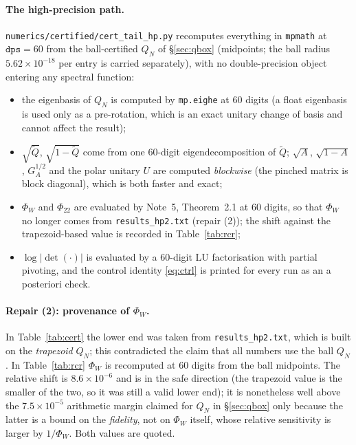 \documentclass[11pt]{article}
\begin{document}
\paragraph{The high-precision path.}  \texttt{numerics/certified/cert\_tail\_hp.py} recomputes
everything in \texttt{mpmath} at $\mathtt{dps}=60$ from the ball-certified $Q_N$ of
\S\ref{sec:qbox} (midpoints; the ball radius $5.62\times10^{-18}$ per entry is carried separately),
with no double-precision object entering any spectral function:
\begin{itemize}[leftmargin=1.6em]
\item the eigenbasis of $Q_N$ is computed by \texttt{mp.eighe} at $60$ digits (a float eigenbasis is
 used only as a pre-rotation, which is an exact unitary change of basis and cannot affect the result);
\item $\sqrt{\widetilde Q}$, $\sqrt{1-\widetilde Q}$ come from one $60$-digit eigendecomposition of
 $\widetilde Q$; $\sqrt A$, $\sqrt{1-A}$, $G_A^{1/2}$ and the polar unitary $U$ are computed
 \emph{blockwise} (the pinched matrix is block diagonal), which is both faster and exact;
\item $\Phi_W$ and $\Phi_{22}$ are evaluated by Note~5, Theorem~2.1 at $60$ digits, so that
 $\Phi_W$ no longer comes from \texttt{results\_hp2.txt} (repair (2)); the shift against the
 trapezoid-based value is recorded in Table~\ref{tab:rcr};
\item $\log|\det(\cdot)|$ is evaluated by a $60$-digit LU factorisation with partial pivoting, and the
 control identity \eqref{eq:ctrl} is printed for every run as an a posteriori check.
\end{itemize}

\paragraph{Repair (2): provenance of $\Phi_W$.}  In Table~\ref{tab:cert} the lower end was taken from
\texttt{results\_hp2.txt}, which is built on the \emph{trapezoid} $Q_N$; this contradicted the claim
that all numbers use the ball $Q_N$.  In Table~\ref{tab:rcr} $\Phi_W$ is recomputed at $60$ digits
from the ball midpoints.  The relative shift is $8.6\times10^{-6}$ and is in the safe direction (the
trapezoid value is the smaller of the two, so it was still a valid lower end); it is nonetheless well
above the $7.5\times10^{-5}$ arithmetic margin claimed for $Q_N$ in \S\ref{sec:qbox} only because the
latter is a bound on the \emph{fidelity}, not on $\Phi_W$ itself, whose relative sensitivity is larger
by $1/\Phi_W$.  Both values are quoted.
\end{document}
